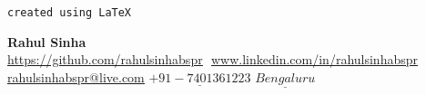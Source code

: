 \documentclass[letterpaper, 12pt]{article}
\begin{document}
	\vspace*{-1cm}
	\begin{minipage}[t]{1\textwidth}
		
		\begin{flushright}
			\texttt{created using {\LaTeX}}
		\end{flushright}
		\vspace*{-1cm}
		\begin{center}
			\textbf{\Huge Rahul Sinha} \\ \vspace{4pt}
			\href{https://github.com/rahulsinhabspr}{\underline{https://github.com/rahulsinhabspr}} $  $
			\href{www.linkedin.com/in/rahulsinhabspr}{\underline{www.linkedin.com/in/rahulsinhabspr}} $  $
			\href{mailto:rahulsinhabspr@live.com}
			{\underline{rahulsinhabspr@live.com}}
			\newline
			{$\underline{+91-7401361223}$}
			{$\underline{Bengaluru}$}
		\end{center}
	\end{minipage}
	\vspace*{1cm}
\end{document}
